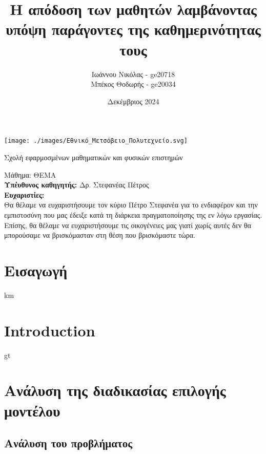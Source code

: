 \documentclass[12pt]{article}
\title{Η απόδοση των μαθητών λαμβάνοντας υπόψη παράγοντες της καθημερινότητας τους}
\author{Ιωάννου Νικόλας - ge20718 
\\ Μπέκος Θοδωρής - ge20034}
\date{Δεκέμβριος 2024}
\begin{document}
\maketitle

\vspace{0.7cm}
\begin{center}
    \texttt{[image: ./images/Εθνικό\_Μετσόβειο\_Πολυτεχνείο.svg]}
    
    \Large Σχολή εφαρμοσμένων μαθηματικών και φυσικών επιστημών \\[1.5cm]
\end{center}



        
\vfill


        \noindent Μάθημα: ΘΕΜΑ \\[0.5cm]


        \noindent\textbf{Υπέυθυνος καθηγητής:} 
        Δρ. Στεφανέας Πέτρος \\[1cm]

\newpage
\noindent\textbf{Ευχαριστίες:} \\

\noindent Θα θέλαμε να ευχαριστήσουμε τον κύριο Πέτρο Στεφανέα για το ενδιαφέρον και
την εμπιστοσύνη που μας έδειξε κατά τη διάρκεια πραγματοποίησης της εν λόγω εργασίας. Επίσης, θα θέλαμε να ευχαριστήσουμε τις οικογένειες μας γιατί χωρίς αυτές δεν θα μπορούσαμε να βρισκόμασταν στη θέση που βρισκόμαστε τώρα.

\newpage
\renewcommand{\contentsname}{\Huge \textbf{Περιεχόμενα}}

\tableofcontents
\newpage

\section{Εισαγωγή}
km \\
\newpage

\section*{Introduction}
gt \\
\newpage
\section{Ανάλυση της διαδικασίας επιλογής μοντέλου}
\subsection{Ανάλυση του προβλήματος}
\end{document}
